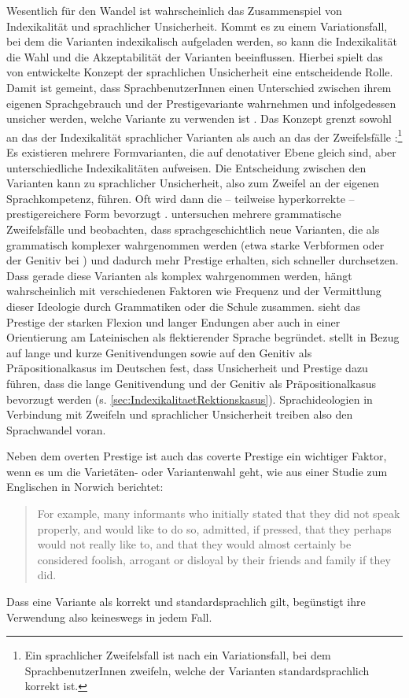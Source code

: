 Wesentlich für den Wandel ist wahrscheinlich das Zusammenspiel von Indexikalität und sprachlicher Unsicherheit. 
Kommt es zu einem Variationsfall, bei dem die Varianten indexikalisch aufgeladen werden, so kann die Indexikalität die Wahl und die Akzeptabilität der Varianten beeinflussen. 
Hierbei spielt das von \citet{Labov2006} entwickelte Konzept der sprachlichen Unsicherheit eine entscheidende Rolle. 
Damit ist gemeint, dass SprachbenutzerInnen einen Unterschied zwischen ihrem eigenen Sprachgebrauch und der Prestigevariante wahrnehmen und infolgedessen unsicher werden, welche Variante zu verwenden ist \citep[s.][]{Labov2006}. 
Das Konzept grenzt sowohl an das der Indexikalität sprachlicher Varianten als auch an das der Zweifelsfälle \citep[s.][7]{Klein2003}:\footnote{Ein sprachlicher Zweifelsfall ist nach \citet[7]{Klein2003} ein Variationsfall, bei dem {Sprach\-be\-nutzerIn\-nen} zweifeln, welche der Varianten standardsprachlich korrekt ist.}
Es existieren mehrere Formvarianten, die auf denotativer Ebene gleich sind, aber unterschiedliche Indexikalitäten aufweisen. 
Die Entscheidung zwischen den Varianten kann zu sprachlicher Unsicherheit, also zum Zweifel an der eigenen Sprachkompetenz, führen. 
Oft wird dann die -- teilweise hyperkorrekte -- prestigereichere Form bevorzugt \citep[s.][326]{BaldaquiEscandellJosepM.2011}. 
\citet{Baumann2014} untersuchen mehrere grammatische Zweifelsfälle und beobachten, dass sprachgeschichtlich neue Varianten, die als grammatisch komplexer wahrgenommen werden (etwa starke Verbformen oder der Genitiv bei ) und dadurch mehr Prestige erhalten, sich schneller durchsetzen.
Dass gerade diese Varianten als komplex wahrgenommen werden, hängt wahrscheinlich mit verschiedenen Faktoren wie Frequenz und der Vermittlung dieser Ideologie durch Grammatiken oder die Schule zusammen. 
\citet[10]{Elspa2005} sieht das Prestige der starken Flexion und langer Endungen aber auch in einer Orientierung am Lateinischen als flektierender Sprache begründet. 
\citet[48]{Szczepaniak2014} stellt in Bezug auf lange und kurze Genitivendungen sowie auf den Genitiv als Präpositionalkasus im Deutschen fest, dass Unsicherheit und Prestige dazu führen, dass die lange Genitivendung und der Genitiv als Präpositionalkasus bevorzugt werden (s. \autoref{sec:IndexikalitaetRektionskasus}). 
Sprachideologien in Verbindung mit Zweifeln und sprachlicher Unsicherheit treiben also den Sprachwandel voran. 

Neben dem overten Prestige ist auch das coverte Prestige ein wichtiger Faktor, wenn es um die Varietäten- oder Variantenwahl geht, wie \citet[]{Trudgill.1972} aus einer Studie zum Englischen in Norwich berichtet: 
\begin{quote} For example, many informants who initially stated that they did not speak properly, and would like to do so, admitted, if pressed, that they perhaps would not really like to, and that they would almost certainly be considered foolish, arrogant or disloyal by their friends and family if they did.~\citep[184]{Trudgill.1972}\end{quote}
Dass eine Variante als korrekt und standardsprachlich gilt, begünstigt ihre Verwendung also keineswegs in jedem Fall.

